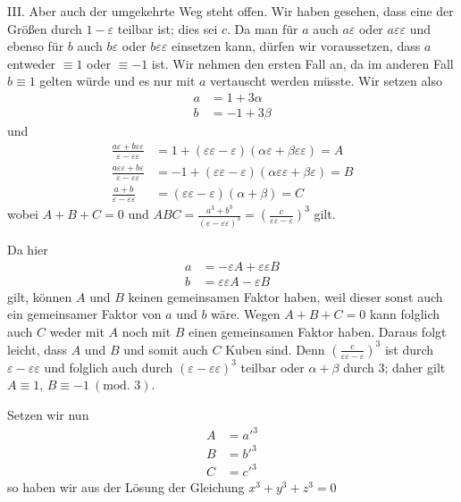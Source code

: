 III. Aber auch der umgekehrte Weg steht offen. Wir haben gesehen, dass eine der Größen durch $1-\varepsilon$ teilbar ist; dies sei $c$. Da man für $a$ auch $a\varepsilon$ oder $a\varepsilon\varepsilon$ und ebenso für $b$ auch $b\varepsilon$ oder $b\varepsilon\varepsilon$ einsetzen kann, dürfen wir voraussetzen, dass $a$ entweder $\equiv1$ oder $\equiv-1$ ist. Wir nehmen den ersten Fall an, da im anderen Fall $b\equiv1$ gelten würde und es nur mit $a$ vertauscht werden müsste. Wir setzen also
\[
\begin{aligned}
a&=1+3\alpha\\
b&=-1+3\beta
\end{aligned}
\]
und
\[
\begin{aligned}
\frac{a\varepsilon+b\varepsilon\varepsilon}{\varepsilon-\varepsilon\varepsilon}&=1+(\varepsilon\varepsilon-\varepsilon)(\alpha\varepsilon+\beta\varepsilon\varepsilon)=A\\
\frac{a\varepsilon\varepsilon+b\varepsilon}{\varepsilon-\varepsilon\varepsilon}&=-1+(\varepsilon\varepsilon-\varepsilon)(\alpha\varepsilon\varepsilon+\beta\varepsilon)=B\\
\frac{a+b}{\varepsilon-\varepsilon\varepsilon}&=(\varepsilon\varepsilon-\varepsilon)(\alpha+\beta)=C
\end{aligned}
\]
wobei $A+B+C=0$ und $ABC=\frac{a^3+b^3}{(\varepsilon-\varepsilon\varepsilon)^3}=\left(\frac c{\varepsilon\varepsilon-\varepsilon}\right)^3$ gilt.

Da hier
\[
\begin{aligned}
a&=-\varepsilon A+\varepsilon\varepsilon B\\
b&=\varepsilon\varepsilon A-\varepsilon B
\end{aligned}
\]
gilt, können $A$ und $B$ keinen gemeinsamen Faktor haben, weil dieser sonst auch ein gemeinsamer Faktor von $a$ und $b$ wäre. Wegen $A+B+C=0$ kann folglich auch $C$ weder mit $A$ noch mit $B$ einen gemeinsamen Faktor haben. Daraus folgt leicht, dass $A$ und $B$ und somit auch $C$ Kuben sind. Denn $\left(\frac c{\varepsilon\varepsilon-\varepsilon}\right)^3$ ist durch $\varepsilon-\varepsilon\varepsilon$ und folglich auch durch $(\varepsilon-\varepsilon\varepsilon)^3$ teilbar oder $\alpha+\beta$ durch $3$; daher gilt $A\equiv1$, $B\equiv-1\ (\text{mod. }3)$.

Setzen wir nun
\[
\begin{aligned}
A&=a'^3\\
B&=b'^3\\
C&=c'^3
\end{aligned}
\]
so haben wir aus der Lösung der Gleichung $x^3+y^3+z^3=0$

